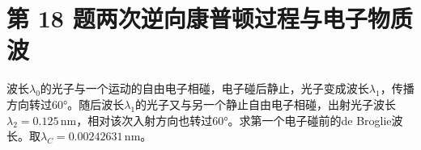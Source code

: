 \documentclass[UTF8,fontset=fandol,a4paper,11pt]{ctexart}
\begin{document}

\section*{第 18 题\quad 两次逆向康普顿过程与电子物质波}\label{q:18}

波长$\lambda_0$的光子与一个运动的自由电子相碰，电子碰后静止，光子变成波长$\lambda_1$，传播方向转过60°。随后波长$\lambda_1$的光子又与另一个静止自由电子相碰，出射光子波长$\lambda_2=0.125\,\mathrm{nm}$，相对该次入射方向也转过60°。求第一个电子碰前的de Broglie波长。取$\lambda_C=0.00242631\,\mathrm{nm}$。

\begin{center}\begin{minipage}{.98\linewidth}\centering
\begin{tikzpicture}[scale=.9,transform shape]

\end{tikzpicture}
\end{minipage}
\end{center}
\end{document}
